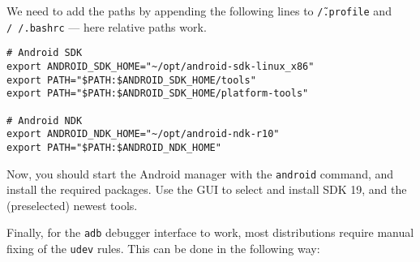 We need to add the paths by appending the following lines to \texttt{\~/.profile} and \texttt{/~/.bashrc} --- here relative paths work.

\begin{verbatim}
# Android SDK
export ANDROID_SDK_HOME="~/opt/android-sdk-linux_x86"
export PATH="$PATH:$ANDROID_SDK_HOME/tools"
export PATH="$PATH:$ANDROID_SDK_HOME/platform-tools"

# Android NDK
export ANDROID_NDK_HOME="~/opt/android-ndk-r10"
export PATH="$PATH:$ANDROID_NDK_HOME"
\end{verbatim}

Now, you should start the Android manager with the \texttt{android} command, and install the required packages. Use the GUI to select and install SDK 19, and the (preselected) newest tools.

Finally, for the \texttt{adb} debugger interface to work, most distributions require manual fixing of the \texttt{udev} rules. This can be done in the following way:

